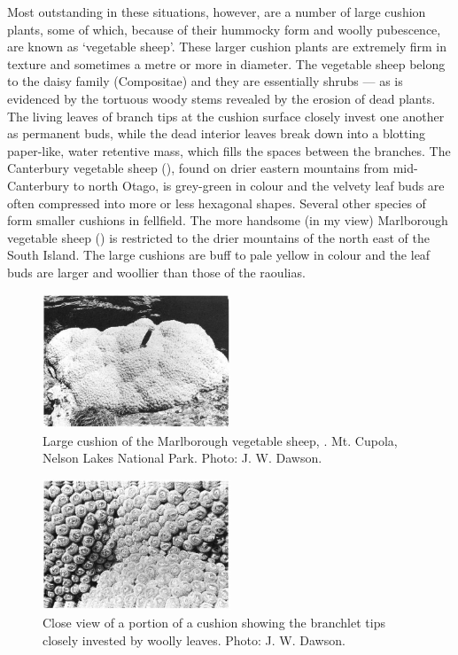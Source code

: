 Most outstanding in these situations, however, are a number of large cushion plants, some of which, because of their hummocky form and woolly pubescence, are known as `vegetable sheep'.
These larger cushion plants are extremely firm in texture and sometimes a metre or more in diameter.
The vegetable sheep belong to the daisy family (Compositae) and they are essentially shrubs --- as is evidenced by the tortuous woody stems revealed by the erosion of dead plants.
The living leaves of branch tips at the cushion surface closely invest one another as permanent buds, while the dead interior leaves break down into a blotting paper-like, water retentive mass, which fills the spaces between the branches.
The Canterbury vegetable sheep (), found on drier eastern mountains from mid-Canterbury to north Otago, is grey-green in colour and the velvety leaf buds are often compressed into more or less hexagonal shapes.
Several other species of  form smaller cushions in fellfield.
The more handsome (in my view) Marlborough vegetable sheep () is restricted to the drier mountains of the north east of the South Island.
The large cushions are buff to pale yellow in colour and the leaf buds are larger and woollier than those of the raoulias.

\begin{figure}
	\includegraphics[width=0.5\textwidth]{graphics/figure108vegetable-sheep.jpg}
	\centering
	\caption[Large cushion of the Marlborough vegetable sheep]{Large cushion of the Marlborough vegetable sheep, .
	Mt. Cupola, Nelson Lakes National Park.
	Photo: J. W. Dawson.}%
	\label{fig:108vegetable-sheep}
\end{figure}

\begin{figure}
	\includegraphics[width=0.5\textwidth]{graphics/figure109haastia.jpg}
	\centering
	\caption[Close view of a portion of a Haastia pulvinaris]{Close view of a portion of a  cushion showing the branchlet tips closely invested by woolly leaves.
	Photo: J. W. Dawson.}%
	\label{fig:109haastia}
\end{figure}

